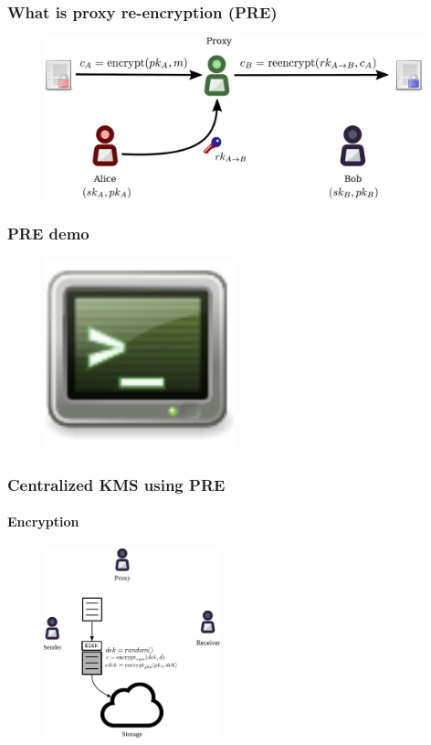 \documentclass[xetex,mathsans,sans]{beamer}
\begin{document}
    \begin{frame}
        \frametitle{What is proxy re-encryption (PRE)}
        \begin{figure}
            \centering
            \includegraphics[width=11cm]{pdf/pre.pdf}
        \end{figure}
    \end{frame}

    \begin{frame}
        \frametitle{PRE demo}
        \begin{figure}
            \centering
            \includegraphics[height=5.5cm]{pdf/terminal.pdf}
        \end{figure}
    \end{frame}

    \begin{frame}
        \frametitle{Centralized KMS using PRE}
        \framesubtitle{Encryption}
        \begin{figure}
            \centering
            \includegraphics[height=5.5cm]{pdf/encrypt.pdf}
        \end{figure}
    \end{frame}
\end{document}
